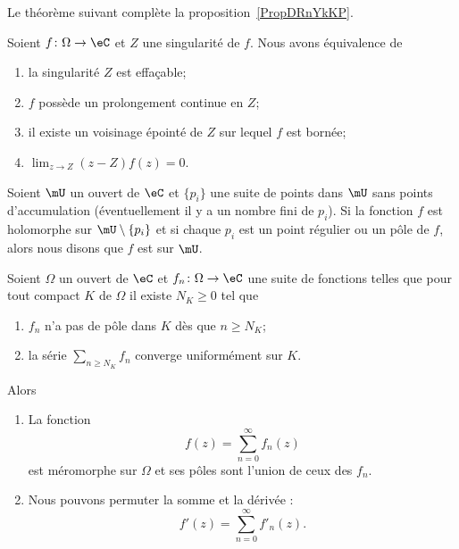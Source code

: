 Le théorème suivant complète la proposition~\ref{PropDRnYkKP}.
\begin{theorem}    \label{ThoTLQOEwW}
    Soient \( f\colon \Omega\to \eC\) et \( Z\) une singularité de \( f\). Nous avons équivalence de
    \begin{enumerate}
        \item
            la singularité \( Z\) est effaçable;
        \item
            \( f\) possède un prolongement continue en \( Z\);
        \item
            il existe un voisinage épointé de \( Z\) sur lequel \( f\) est bornée;
        \item
            \( \lim_{z\to Z}(z-Z)f(z)=0\).
    \end{enumerate}
\end{theorem}

\begin{definition}
    Soient \( \mU\) un ouvert de \( \eC\) et \( \{ p_i \}\) une suite de points dans \( \mU\) sans points d'accumulation (éventuellement il y a un nombre fini de \( p_i\)). Si la fonction \( f\) est holomorphe sur \( \mU\setminus\{ p_i \}\) et si chaque \( p_i\) est un point régulier ou un pôle de \( f\), alors nous disons que \( f\) est  sur \( \mU\).
\end{definition}

\begin{proposition} \label{PropPUZTQKl}
    Soient \( \Omega\) un ouvert de \( \eC\) et \( f_n\colon \Omega\to \eC\) une suite de fonctions telles que pour tout compact \( K\) de \( \Omega\) il existe \( N_K\geq 0\) tel que
    \begin{enumerate}
        \item
            \( f_n\) n'a pas de pôle dans \( K\) dès que \( n\geq N_K\);
        \item
            la série \( \sum_{n\geq N_K}f_n\) converge uniformément sur \( K\).
    \end{enumerate}
    Alors
    \begin{enumerate}
        \item
            La fonction
            \begin{equation}
                f(z)=\sum_{n=0}^{\infty}f_n(z)
            \end{equation}
            est méromorphe sur \( \Omega\) et ses pôles sont l'union de ceux des \( f_n\).
        \item
            Nous pouvons permuter la somme et la dérivée :
            \begin{equation}
                f'(z)=\sum_{n=0}^{\infty}f'_n(z).
            \end{equation}
    \end{enumerate}
\end{proposition}


